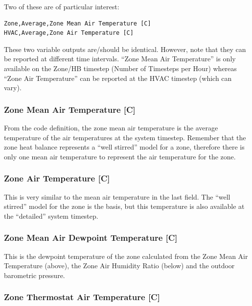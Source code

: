 Two of these are of particular interest:

\begin{lstlisting}
Zone,Average,Zone Mean Air Temperature [C]
HVAC,Average,Zone Air Temperature [C]
\end{lstlisting}

These two variable outputs are/should be identical. However, note that they can be reported at different time intervals. ``Zone Mean Air Temperature'' is only available on the Zone/HB timestep (Number of Timesteps per Hour) whereas ``Zone Air Temperature'' can be reported at the HVAC timestep (which can vary).

\subsubsection{Zone Mean Air Temperature {[}C{]}}\label{zone-mean-air-temperature-c}

From the code definition, the zone mean air temperature is the average temperature of the air temperatures at the system timestep. Remember that the zone heat balance represents a ``well stirred'' model for a zone, therefore there is only one mean air temperature to represent the air temperature for the zone.

\subsubsection{Zone Air Temperature {[}C{]}}\label{zone-air-temperature-c}

This is very similar to the mean air temperature in the last field. The ``well stirred'' model for the zone is the basis, but this temperature is also available at the ``detailed'' system timestep.

\subsubsection{Zone Mean Air Dewpoint Temperature {[}C{]}}\label{zone-mean-air-dewpoint-temperature-c}

This is the dewpoint temperature of the zone calculated from the Zone Mean Air Temperature (above), the Zone Air Humidity Ratio (below) and the outdoor barometric pressure.

\subsubsection{Zone Thermostat Air Temperature {[}C{]}}\label{zone-thermostat-air-temperature-c}

